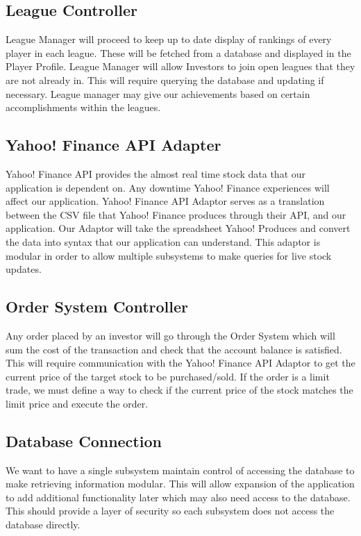 \subsection{League Controller}
League Manager will proceed to keep up to date display of rankings of every
player in each league. These will be fetched from a database and displayed
in the Player Profile. League Manager will allow Investors to join open
leagues that they are not already in. This will require querying the
database and updating if necessary. League manager may give our achievements
based on certain accomplishments within the leagues.\\

\subsection{Yahoo! Finance API Adapter}
Yahoo! Finance API provides the almost real time stock data that our
application is dependent on. Any downtime Yahoo! Finance experiences
will affect our application. Yahoo! Finance API Adaptor serves as a
translation between the CSV file that Yahoo! Finance produces through
their API, and our application. Our Adaptor will take the spreadsheet
Yahoo! Produces and convert the data into syntax that our application
can understand. This adaptor is modular in order to allow multiple
subsystems to make queries for live stock updates.\\

\subsection{Order System Controller}
Any order placed by an investor will go through the Order System which will
sum the cost of the transaction and check that the account balance is satisfied.
This will require communication with the Yahoo! Finance API Adaptor to get the
current price of the target stock to be purchased/sold. If the order is a limit
trade, we must define a way to check if the current price of the stock matches
the limit price and execute the order.\\

\subsection{Database Connection}
We want to have a single subsystem maintain control of accessing the database
to make retrieving information modular. This will allow expansion of the
application to add additional functionality later which may also need access
to the database. This should provide a layer of security so each subsystem does
not access the database directly.\\

